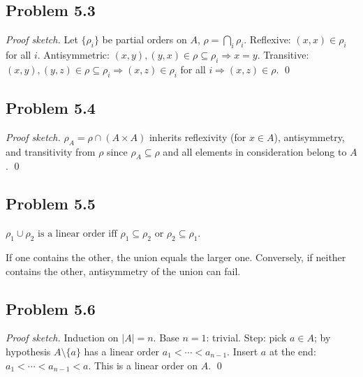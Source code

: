 
\subsection*{Problem 5.3}

\emph{Proof sketch.} Let $\{\rho_i\}$ be partial orders on $A$, $\rho=\bigcap_i\rho_i$.
Reflexive: $(x,x)\in\rho_i$ for all $i$.
Antisymmetric: $(x,y),(y,x)\in\rho\subseteq\rho_i\Rightarrow x=y$.
Transitive: $(x,y),(y,z)\in\rho\subseteq\rho_i\Rightarrow(x,z)\in\rho_i$ for all $i\Rightarrow(x,z)\in\rho$. \qed


\subsection*{Problem 5.4}

\emph{Proof sketch.} $\rho_A=\rho\cap(A\times A)$ inherits reflexivity (for $x\in A$), antisymmetry, and transitivity from $\rho$ since $\rho_A\subseteq\rho$ and all elements in consideration belong to $A$. \qed


\subsection*{Problem 5.5}

$\boxed{\rho_1\cup\rho_2\text{ is a linear order iff }\rho_1\subseteq\rho_2\text{ or }\rho_2\subseteq\rho_1.}$

If one contains the other, the union equals the larger one. Conversely, if neither contains the other, antisymmetry of the union can fail.


\subsection*{Problem 5.6}

\emph{Proof sketch.} Induction on $|A|=n$. Base $n=1$: trivial. Step: pick $a\in A$; by hypothesis $A\setminus\{a\}$ has a linear order $a_1<\cdots<a_{n-1}$. Insert $a$ at the end: $a_1<\cdots<a_{n-1}<a$. This is a linear order on $A$. \qed


